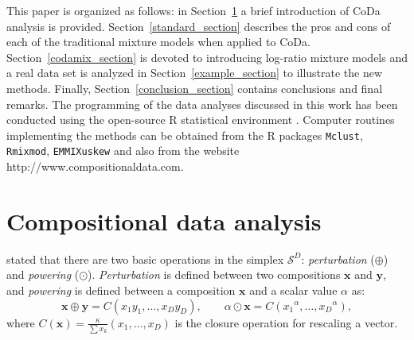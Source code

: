 \documentclass[12pt, a4paper]{article}
\begin{document}
This paper is organized as follows: in Section~\ref{coda_section} a brief introduction of CoDa analysis is provided. Section~\ref{standard_section} describes the pros and cons of each of the traditional mixture models when applied to CoDa. Section~\ref{codamix_section} is devoted to introducing log-ratio mixture models and a real data set is analyzed in Section~\ref{example_section} to illustrate the new methods. Finally, Section~\ref{conclusion_section} contains conclusions and final remarks. The programming of the data analyses discussed in this work has been conducted using the open-source R statistical environment \citep{R2014soft}. Computer routines implementing the methods can be obtained from the R packages \texttt{Mclust}, \texttt{Rmixmod}, \texttt{EMMIXuskew} and also from the website http://www.compositionaldata.com.




\section{Compositional data analysis}
\label{coda_section}


 \noindent \cite{aitchison1986statistical} stated that  there are two basic operations in the simplex $\mathcal{S}^D$: \emph{perturbation} ($\oplus$) and 
 \emph{powering} ($\odot$). \emph{Perturbation} is defined between two compositions $\textbf{x}$ 
and $\textbf{y}$,  and \emph{powering} is defined between a composition $\textbf{x}$ and a scalar value $\alpha$ as:
\begin{equation}
\textbf{x} \oplus \textbf{y} =  C( x_1 y_1, \dots, x_D y_D), \qquad \alpha
 \odot \textbf{x} =  C( {x_1}^\alpha, \dots, {x_D}^\alpha),
\label{pert_pow}
\end{equation}
where $C(\textbf{x})=\frac{\kappa}{\sum x_k}(x_1, \dots, x_D) $ is the closure operation for rescaling a vector.
\end{document}
